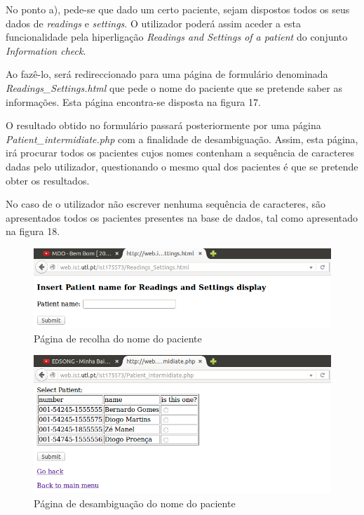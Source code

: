 \documentclass[a4paper]{article}
\begin{document}
No ponto a), pede-se que dado um certo paciente, sejam dispostos todos os seus dados de \textit{readings} e \textit{settings}. O utilizador poderá assim aceder a esta funcionalidade pela hiperligação \textit{Readings and Settings of a patient} do conjunto \textit{Information check}.

Ao fazê-lo, será redireccionado para uma página de formulário denominada \textit{Readings\_Settings.html} que pede o nome do paciente que se pretende saber as informações. Esta página encontra-se disposta na figura 17.

O resultado obtido no formulário passará posteriormente por uma página \textit{Patient\_intermidiate.php} com a finalidade de desambiguação. Assim, esta página, irá procurar todos os pacientes cujos nomes contenham a sequência de caracteres dadas pelo utilizador, questionando o mesmo qual dos pacientes é que se pretende obter os resultados.

No caso de o utilizador não escrever nenhuma sequência de caracteres, são apresentados todos os pacientes presentes na base de dados, tal como apresentado na figura 18.

\begin{figure}[ht!]
\centering
\includegraphics[scale=0.53]{Readings_Settings_html.png}
\caption{Página de recolha do nome do paciente}
\end{figure}

\begin{figure}[ht!]
\centering
\includegraphics[scale=0.53]{Patient_intermidiate_php.png}
\caption{Página de desambiguação do nome do paciente}
\end{figure}
\end{document}
